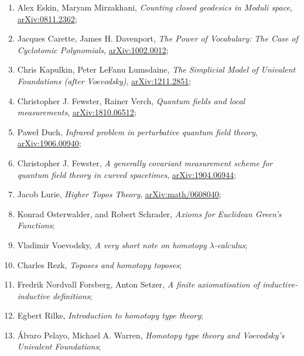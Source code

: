 \documentclass[a4paper,11pt]{article}
\begin{document}
\begin{enumerate}
\item Alex Eskin, Maryam Mirzakhani, \emph{Counting closed geodesics
    in Moduli space},
  \href{https://arxiv.org/abs/0811.2362v3}{arXiv:0811.2362};

\item Jacques Carette, James H. Davenport, \emph{The Power of
    Vocabulary: The Case of Cyclotomic Polynomials},
  \href{https://arxiv.org/abs/1002.0012v1}{arXiv:1002.0012};

\item Chris Kapulkin, Peter LeFanu Lumsdaine, \emph{The Simplicial
    Model of Univalent Foundations (after Voevodsky)},
  \href{https://arxiv.org/abs/1211.2851v5}{arXiv:1211.2851};

\item Christopher J. Fewster, Rainer Verch, \emph{Quantum fields and
    local measurements},
  \href{https://arxiv.org/abs/1810.06512}{arXiv:1810.06512};

\item Paweł Duch, \emph{Infrared problem in perturbative quantum field
    theory},
  \href{https://arxiv.org/abs/1906.00940}{arXiv:1906.00940};

\item Christopher J. Fewster, \emph{A generally covariant measurement
    scheme for quantum field theory in curved spacetimes},
  \href{https://arxiv.org/abs/1904.06944v1}{arXiv:1904.06944};

\item Jacob Lurie, \emph{Higher Topos Theory},
  \href{https://arxiv.org/abs/math/0608040v4}{arXiv:math/0608040};

\item Konrad Osterwalder, and Robert Schrader, \emph{Axioms for
    Euclidean Green's Functions};

\item Vladimir Voevodsky, \emph{A very short note on homotopy
    $\lambda$-calculus};

\item Charles Rezk, \emph{Toposes and homotopy toposes};

\item Fredrik Nordvall Forsberg, Anton Setzer, \emph{A finite
    axiomatisation of inductive-inductive definitions};

\item Egbert Rilke, \emph{Introduction to homotopy type theory};

\item \'{A}lvaro Pelayo, Michael A. Warren, \emph{Homotopy type theory
    and Voevodsky’s Univalent Foundations};


\end{enumerate}
\end{document}
